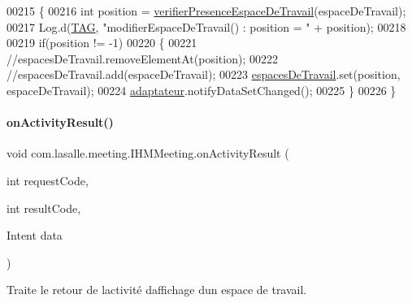 \begin{DoxyCode}
00215     \{
00216         \textcolor{keywordtype}{int} position = \hyperlink{classcom_1_1lasalle_1_1meeting_1_1_i_h_m_meeting_a402dc23f375fae1f1faa3d5728cdad00}{verifierPresenceEspaceDeTravail}(espaceDeTravail);
00217         Log.d(\hyperlink{classcom_1_1lasalle_1_1meeting_1_1_i_h_m_meeting_a239eafcb0ccc896bdba538d1c0f08e65}{TAG}, \textcolor{stringliteral}{"modifierEspaceDeTravail() : position = "} + position);
00218 
00219         \textcolor{keywordflow}{if}(position != -1)
00220         \{
00221             \textcolor{comment}{//espacesDeTravail.removeElementAt(position);}
00222             \textcolor{comment}{//espacesDeTravail.add(espaceDeTravail);}
00223             \hyperlink{classcom_1_1lasalle_1_1meeting_1_1_i_h_m_meeting_acba41978aec60c27f07db774f9b68b68}{espacesDeTravail}.set(position, espaceDeTravail);
00224             \hyperlink{classcom_1_1lasalle_1_1meeting_1_1_i_h_m_meeting_ac103010077163ba43b830ffe524f476d}{adaptateur}.notifyDataSetChanged();
00225         \}
00226     \}
\end{DoxyCode}
\mbox{\label{classcom_1_1lasalle_1_1meeting_1_1_i_h_m_meeting_aa7f5623eef9a049cf786ff15a4c63274}} 
\paragraph{\texorpdfstring{on\+Activity\+Result()}{onActivityResult()}}
{\footnotesize\ttfamily void com.\+lasalle.\+meeting.\+I\+H\+M\+Meeting.\+on\+Activity\+Result (\begin{DoxyParamCaption}\item[{int}]{request\+Code,  }\item[{int}]{result\+Code,  }\item[{Intent}]{data }\end{DoxyParamCaption})\hspace{0.3cm}{\ttfamily [protected]}}



Traite le retour de l\textquotesingle{}activité d\textquotesingle{}affichage d\textquotesingle{}un espace de travail. 



